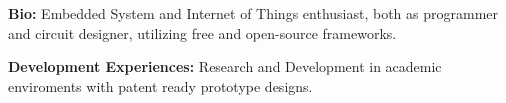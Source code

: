 %
%

\par{
{\textbf{Bio:}}
Embedded System and Internet of Things enthusiast, both as programmer and circuit designer, utilizing free and open-source frameworks.

{\textbf{Development Experiences:}}
Research and Development in academic enviroments with patent ready prototype designs.
}
